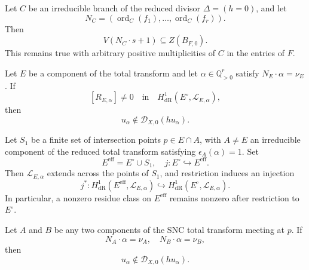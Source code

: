 \documentclass[10pt,a4paper]{amsart}
\DeclareMathOperator{\ord}{ord}
\newcommand{\D}{\mathscr D}
\newcommand{\Lcal}{\mathscr L}
\newcommand{\Q}{\mathbb Q}
\begin{document}
\begin{theorem}\label{thm:strict-transform-wall}
Let $C$ be an irreducible branch of the reduced divisor $\Delta=(h=0)$, and let
\[
 N_C=(\ord_C(f_1),\ldots,\ord_C(f_r)).
\]
Then
\begin{equation}\label{eq:strict-transform-wall}
 V(N_C\cdot s+1)
 \subseteq
 Z(B_{F,0}).
\end{equation}
This remains true with arbitrary positive multiplicities of $C$ in the entries of $F$.
\end{theorem}

\begin{theorem}\label{thm:direct-residue-obstruction}
Let $E$ be a component of the total transform and let $\alpha\in\Q_{>0}^r$ satisfy $N_E\cdot\alpha=\nu_E$. If
\begin{equation}\label{eq:nonzero-residue-class}
[R_{E,\alpha}]\neq0\quad\text{in}\quad H^1_{\mathrm{dR}}(E^\circ,\Lcal_{E,\alpha}),
\end{equation}
then
\begin{equation*}
u_\alpha\notin\D_{X,0}(hu_\alpha).
\end{equation*}
\end{theorem}

\begin{proposition}\label{prop:residue-one-injection}
Let $S_1$ be a finite set of intersection points $p\in E\cap A$, with $A\neq E$ an irreducible component of the reduced total transform satisfying $\epsilon_A(\alpha)=1$. Set
\begin{equation*}
E^{\mathrm{eff}}=E^\circ\cup S_1,\quad j:E^\circ\hookrightarrow E^{\mathrm{eff}}.
\end{equation*}
Then $\Lcal_{E,\alpha}$ extends across the points of $S_1$, and restriction induces an injection
\begin{equation}\label{eq:residue-one-injection}
j^*:H^1_{\mathrm{dR}}(E^{\mathrm{eff}},\Lcal_{E,\alpha})\hookrightarrow H^1_{\mathrm{dR}}(E^\circ,\Lcal_{E,\alpha}).
\end{equation}
In particular, a nonzero residue class on $E^{\mathrm{eff}}$ remains nonzero after restriction to $E^\circ$.
\end{proposition}

\begin{theorem}
\label{thm:direct-double-residue-obstruction}
Let $A$ and $B$ be any two components of the SNC total transform meeting at $p$. If
\begin{equation}\label{eq:two-wall-equalities}
 N_A\cdot\alpha=\nu_A,
 \quad
 N_B\cdot\alpha=\nu_B,
\end{equation}
then
\[
 u_\alpha\notin\D_{X,0}(hu_\alpha).
\]
\end{theorem}
\end{document}
